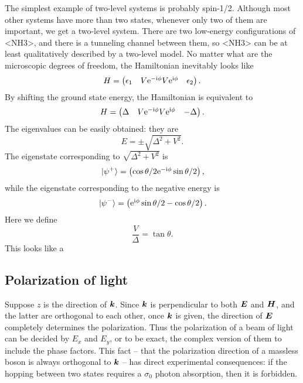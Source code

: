 \documentclass[hyperref, a4paper]{article}
\newcommand*{\ii}{\mathrm{i}}
\newcommand*{\ee}{\mathrm{e}}
\def\\{}%
\def\ce#1{<#1>}%
\begin{document}
The simplest example of two-level systems 
is probably spin-1/2.
Although most other systems have more than two states, 
whenever only two of them are important,
we get a two-level system.
There are two low-energy configurations of \ce{NH3},
and there is a tunneling channel between them,
so \ce{NH3} can be at least qualitatively described
by a two-level model.
No matter what are the microscopic degrees of freedom, 
the Hamiltonian inevitably looks like 
\begin{equation}
    H = \pmqty{
        \epsilon_1 & V \ee^{- \ii \phi} \\
        V \ee^{\ii \phi} & \epsilon_2
    }.
\end{equation}
By shifting the ground state energy, 
the Hamiltonian is equivalent to 
\begin{equation}
    H = \pmqty{
        \Delta & V \ee^{- \ii \phi} \\
        V \ee^{\ii \phi} & - \Delta
    }.
\end{equation}
The eigenvalues can be easily obtained: 
they are 
\begin{equation}
    E = \pm \sqrt{\Delta^2 + V^2}.
\end{equation}
The eigenstate corresponding to $\sqrt{\Delta^2 + V^2}$ is
\begin{equation}
    \ket*{\psi^+} = \pmqty{
        \cos \theta / 2 \\
        \ee^{- \ii \phi} \sin \theta / 2
    },
\end{equation}
while the eigenstate corresponding to the negative energy is 
\begin{equation}
    \ket*{\psi^-} = \pmqty{
        \ee^{\ii \phi} \sin \theta / 2 \\
        - \cos \theta / 2
    }.
\end{equation}
Here we define 
\begin{equation}
    \frac{V}{\Delta} = \tan \theta.
\end{equation}
This looks like a 

\subsection{Polarization of light}

Suppose $z$ is the direction of $\vb*{k}$.
Since $\vb*{k}$ is perpendicular to both $\vb*{E}$ and $\vb*{H}$,
and the latter are orthogonal to each other, 
once $\vb*{k}$ is given, 
the direction of $\vb*{E}$ completely determines the polarization.
Thus the polarization of a beam of light can be decided by $E_x$ and $E_y$,
or to be exact, 
the complex version of them to include the phase factors.
This fact -- that the polarization direction of a massless boson is always orthogonal to $\vb*{k}$ -- 
has direct experimental consequences:
if the hopping between two states requires a $\sigma_0$ photon absorption, 
then it is forbidden.
\end{document}
